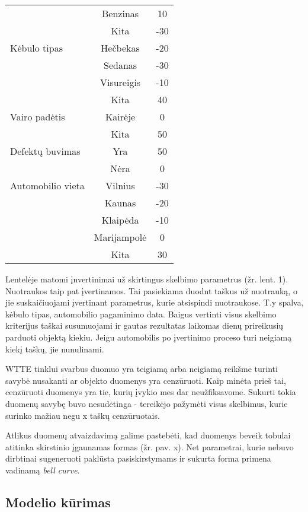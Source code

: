 \documentclass{VUMIFPSkursinis}
\begin{document}
\begin{table}[H]
{\begin{tabular}{|l|c|c|}
        & Benzinas   & 10      \\
        & Kita   & -30      \\
    \hline
    Kėbulo tipas & Hečbekas   & -20\\
        & Sedanas   & -30      \\
        & Visureigis   & -10      \\
        & Kita   & 40     \\
    \hline
    Vairo padėtis & Kairėje   & 0\\
        & Kita   & 50      \\
    \hline
    Defektų buvimas & Yra   & 50\\
        & Nėra   & 0      \\
    \hline
    Automobilio vieta & Vilnius   & -30\\
        & Kaunas   & -20      \\
        & Klaipėda   & -10      \\
        & Marijampolė   & 0      \\
        & Kita   & 30      \\
    \hline
  \end{tabular}}
  \label{tab:table example}
\end{table}

Lentelėje matomi įnvertinimai už skirtingus skelbimo parametrus (žr. lent. 1). Nuotraukos taip pat įvertinamos. Tai pasiekiama duodnt taškus už nuotrauką, o jie suskaičiuojami įvertinant parametrus, kurie atsispindi nuotraukose. T.y spalva, kėbulo tipas, automobilio pagaminimo data. Baigus vertinti visus skelbimo kriterijus taškai susumuojami ir gautas rezultatas laikomas dienų prireikusių parduoti objektą kiekiu. Jeigu automobilis po įvertinimo proceso turi neigiamą kiekį taškų, jie nunulinami. 

WTTE tinklui svarbus duomuo yra teigiamą arba neigiamą reikšme turinti savybė nusakanti ar objekto duomenys yra cenzūruoti. Kaip minėta prieš tai, cenzūruoti duomenys yra tie, kurių įvykio mes dar neužfiksavome. Sukurti tokia duomenų savybę buvo nesudėtinga - tereikėjo pažymėti visus skelbimus, kurie surinko mažiau negu x taškų cenzūruotais. 

Atlikus duomenų atvaizdavimą galime pastebėti, kad duomenys beveik tobulai atitinka skirstinio įgaunamas formas (žr. pav. x). Net parametrai, kurie nebuvo dirbtinai sugeneruoti paklūsta pasiskirstymams ir sukurta forma primena vadinamą \textit{bell curve}. 

\subsection{Modelio kūrimas}
\end{document}
